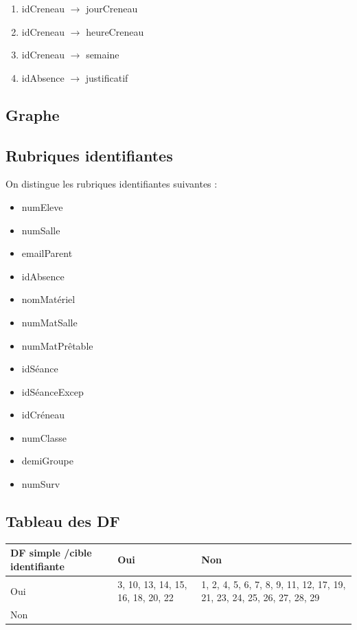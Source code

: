\documentclass[12pt,french,titlepage]{article}
\begin{document}
\begin{enumerate}
\item idCreneau $\rightarrow$ jourCreneau   
\item	 idCreneau $\rightarrow$ heureCreneau   
\item	 idCreneau $\rightarrow$ semaine  

\item idAbsence $\rightarrow$ justificatif
      \end{enumerate}
      
      \subsection{Graphe}
      
      \subsection{Rubriques identifiantes}
      
      On distingue les rubriques identifiantes suivantes :
      
      \begin{itemize}
          \item numEleve
          \item numSalle
          \item emailParent
          \item idAbsence
          \item nomMatériel
          \item numMatSalle
          \item numMatPrêtable
          \item idSéance
          \item idSéanceExcep
          \item idCréneau
          \item numClasse
          \item demiGroupe
          \item numSurv
          
      \end{itemize}

    \subsection{Tableau des DF}
    
    \begin{tabular}{|p{4cm}|p{5cm}|p{5cm}|}
    \hline
        DF simple /cible identifiante & Oui & Non\\
        \hline
        Oui &  3, 10, 13, 14, 15, 16, 18, 20, 22  
        & 1, 2, 4, 5, 6, 7, 8, 9, 11, 12, 17, 19, 21, 23, 24, 25, 26, 27, 28, 29 \\
         \hline
        Non & & \\
        \hline
        
        
    \end{tabular}
\end{document}
